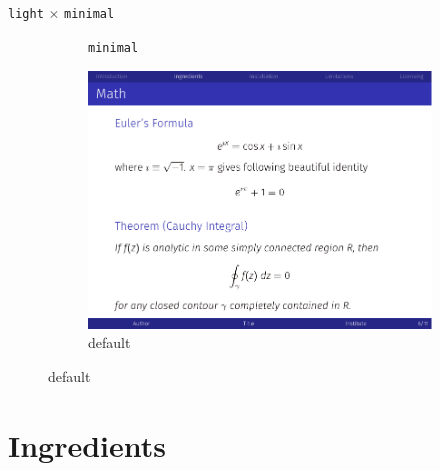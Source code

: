 \documentclass{beamer}%
\begin{document}
\begin{frame}{\texttt{light$\,\times\,$minimal}}
\begin{figure}[!ht]
\begin{subfigure}{.5\textwidth}
	\caption{\texttt{minimal}}
	\label{fig:minimal}
\end{subfigure}%
\begin{subfigure}{.5\textwidth}
	\centering
	\includegraphics[width=.75\linewidth]{tutorial-default-math}
	\caption{default}
	\label{fig:default}
\end{subfigure}
\label{fig:style}
\end{figure}
\end{frame}



\section{Ingredients}
\end{document}
